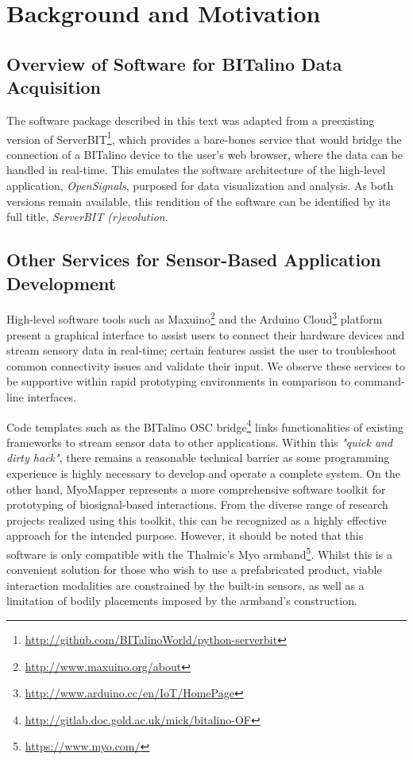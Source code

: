 \section{Background and Motivation}

\subsection{Overview of Software for BITalino Data Acquisition}
The software package described in this text was adapted from a preexisting version of ServerBIT\footnote[1]{\url{http://github.com/BITalinoWorld/python-serverbit}}, which provides a bare-bones service that would bridge the connection of a BITalino device to the user’s web browser, where the data can be handled in real-time. This emulates the software architecture of the high-level application, \textit{OpenSignals}, purposed for data visualization and analysis. As both versions remain available, this rendition of the software can be identified by its full title, \textit{ServerBIT (r)evolution}.

\subsection{Other Services for Sensor-Based Application Development} \label{services}
High-level software tools such as Maxuino\footnote[2]{\url{http://www.maxuino.org/about}} and the Arduino Cloud\footnote[3]{\url{http://www.arduino.cc/en/IoT/HomePage}} platform present a graphical interface to assist users to connect their hardware devices and stream sensory data in real-time; certain features assist the user to troubleshoot common connectivity issues and validate their input. We observe these services to be supportive within rapid prototyping environments in comparison to command-line interfaces.

Code templates such as the BITalino OSC bridge\footnote[4]{\url{http://gitlab.doc.gold.ac.uk/mick/bitalino-OF}} links functionalities of existing frameworks to stream sensor data to other applications. Within this \textit{"quick and dirty hack"}, there remains a reasonable technical barrier as some programming experience is highly necessary to develop and operate a complete system. On the other hand, MyoMapper\cite{donato_myo_nodate}  represents a more comprehensive software toolkit for prototyping of biosignal-based interactions. From the diverse range of research projects realized using this toolkit\cite{brown_simple_2018,bullock_approaches_2016,di_donato_accessible_2019}, this can be recognized as a highly effective approach for the intended purpose. However, it should be noted that this software is only compatible with the Thalmic's Myo armband\footnote{\url{https://www.myo.com/}}. Whilst this is a convenient solution for those who wish to use a prefabricated product, viable interaction modalities are constrained by the built-in sensors, as well as a limitation of bodily placements imposed by the armband's construction.

